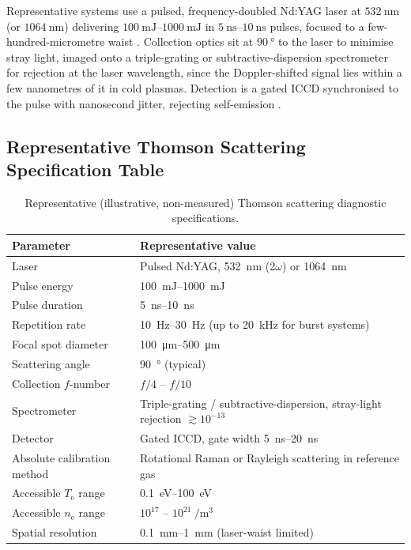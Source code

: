 Representative systems use a pulsed, frequency-doubled Nd:YAG laser at $\SI{532}{\nano\meter}$ (or $\SI{1064}{\nano\meter}$) delivering $\SIrange{100}{1000}{\milli\joule}$ in $\SIrange{5}{10}{\nano\second}$ pulses, focused to a few-hundred-micrometre waist \cite{ref0357}. Collection optics sit at $\SI{90}{\degree}$ to the laser to minimise stray light, imaged onto a triple-grating or subtractive-dispersion spectrometer for rejection at the laser wavelength, since the Doppler-shifted signal lies within a few nanometres of it in cold plasmas. Detection is a gated ICCD synchronised to the pulse with nanosecond jitter, rejecting self-emission \cite{ref0362}.

\subsection{Representative Thomson Scattering Specification Table}

\begin{table}[htbp]
\centering
\caption{Representative (illustrative, non-measured) Thomson scattering diagnostic specifications.}
\label{tab:thomson-specs}
\begin{tabular}{@{}ll@{}}
\toprule
Parameter & Representative value \\
\midrule
Laser & Pulsed Nd:YAG, \SI{532}{\nano\meter} (2$\omega$) or \SI{1064}{\nano\meter} \\
Pulse energy & \SIrange{100}{1000}{\milli\joule} \\
Pulse duration & \SIrange{5}{10}{\nano\second} \\
Repetition rate & \SIrange{10}{30}{\hertz} (up to \SI{20}{\kilo\hertz} for burst systems) \\
Focal spot diameter & \SIrange{100}{500}{\micro\meter} \\
Scattering angle & \SI{90}{\degree} (typical) \\
Collection $f$-number & $f/4$ -- $f/10$ \\
Spectrometer & Triple-grating / subtractive-dispersion, stray-light rejection $\gtrsim 10^{-13}$ \\
Detector & Gated ICCD, gate width \SIrange{5}{20}{\nano\second} \\
Absolute calibration method & Rotational Raman or Rayleigh scattering in reference gas \\
Accessible $T_{\mathrm{e}}$ range & \SIrange{0.1}{100}{\electronvolt} \\
Accessible $n_{\mathrm{e}}$ range & $10^{17}$ -- $10^{21}\ \si{\per\meter\cubed}$ \\
Spatial resolution & \SIrange{0.1}{1}{\milli\meter} (laser-waist limited) \\
\bottomrule
\end{tabular}
\end{table}

